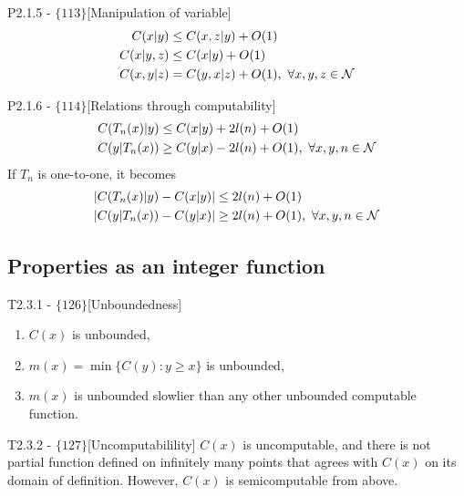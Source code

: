 \documentclass{article}
\begin{document}
\begin{flexilemma}{P2.1.5 - $\{113\}$}[Manipulation of variable]
    \begin{align}
        C(x|y) &\leq C(x,z|y) + O(1)\\
        C(x|y,z) & \leq C(x|y) + O(1)\\
        C(x,y|z) & = C(y,x|z) + O(1) , \ \forall x,y,z \in \mathcal{N}
    \end{align}
\end{flexilemma}
\begin{flexitheorem}{P2.1.6 - $\{114\}$}[Relations through computability]
    \begin{align}
        C(T_n(x)|y) & \leq C(x|y) + 2 l(n) + O(1)\\
        C(y|T_n(x)) & \geq C(y|x) - 2 l(n) + O(1), \ \forall x,y,n \in \mathcal{N}
    \end{align}
    If $T_n$ is one-to-one, it becomes
    \begin{align}
        |C(T_n(x)|y)- C(x|y)| & \leq  2 l(n) + O(1)\\
        |C(y|T_n(x)) - C(y|x)| & \geq  2 l(n) + O(1), \ \forall x,y,n \in \mathcal{N}
    \end{align}
\end{flexitheorem}

\subsection{Properties as an integer function}

\begin{flexitheorem}{T2.3.1 - $\{126\}$}[Unboundedness]
    \begin{enumerate}[label=(\alph*)]
        \item $C(x)$ is unbounded,
        \item $m(x) = \min \{C(y) : y \geq x \}$ is unbounded,
        \item $m(x)$ is unbounded slowlier than any other unbounded computable function.
    \end{enumerate}
\end{flexitheorem}

\begin{flexitheorem}{T2.3.2 - $\{127\}$}[Uncomputabilility]
    $C(x)$ is uncomputable, and there is not partial function defined on infinitely many points that agrees with $C(x)$ on its domain of definition. However, $C(x)$ is semicomputable from above.
\end{flexitheorem}
\end{document}
